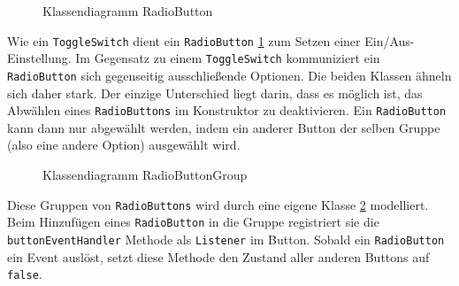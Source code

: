 		\medskip
		\begin{figure}
			\caption{Klassendiagramm RadioButton}
			\label{uml-radiobutton}
		\end{figure}
		Wie ein \texttt{ToggleSwitch} dient ein \texttt{RadioButton} \ref{uml-radiobutton} zum Setzen einer Ein/Aus-Einstellung.
		Im Gegensatz zu einem \texttt{ToggleSwitch} kommuniziert ein \texttt{RadioButton} sich gegenseitig ausschließende Optionen.
		Die beiden Klassen ähneln sich daher stark. Der einzige Unterschied liegt darin, dass es möglich ist, das Abwählen eines
		\texttt{RadioButtons} im Konstruktor zu deaktivieren. Ein \texttt{RadioButton} kann dann nur abgewählt werden,
		indem ein anderer Button der selben Gruppe (also eine andere Option) ausgewählt wird.
		
		\medskip
		\begin{figure}
			\scalebox{0.75}{
				\begin{tikzpicture}
					
				\end{tikzpicture}
			}
			\label{uml-radiogroup}
			\caption{Klassendiagramm RadioButtonGroup}
		\end{figure}
		Diese Gruppen von \texttt{RadioButtons} wird durch eine eigene Klasse \ref{uml-radiogroup} modelliert.
		Beim Hinzufügen eines \texttt{RadioButton} in die Gruppe registriert sie die \texttt{buttonEventHandler} Methode als \texttt{Listener} im Button.
		Sobald ein \texttt{RadioButton} ein Event auslöst, setzt diese Methode den Zustand aller anderen Buttons auf \texttt{false}.
		
